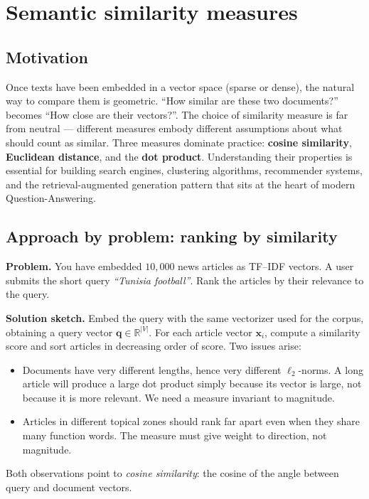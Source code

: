 \documentclass[12pt,a4paper]{report}
\theoremstyle{definition}
\theoremstyle{remark}
\begin{document}
\section{Semantic similarity measures}

\subsection{Motivation}
Once texts have been embedded in a vector space (sparse or dense), the natural way to compare them is geometric. ``How similar are these two documents?'' becomes ``How close are their vectors?''. The choice of similarity measure is far from neutral --- different measures embody different assumptions about what should count as similar. Three measures dominate practice: \textbf{cosine similarity}, \textbf{Euclidean distance}, and the \textbf{dot product}. Understanding their properties is essential for building search engines, clustering algorithms, recommender systems, and the retrieval-augmented generation pattern that sits at the heart of modern Question-Answering.

\subsection{Approach by problem: ranking by similarity}
\textbf{Problem.} You have embedded $10{,}000$ news articles as TF--IDF vectors. A user submits the short query \emph{``Tunisia football''}. Rank the articles by their relevance to the query.

\textbf{Solution sketch.} Embed the query with the same vectorizer used for the corpus, obtaining a query vector $\mathbf{q} \in \mathbb{R}^{|V|}$. For each article vector $\mathbf{x}_i$, compute a similarity score and sort articles in decreasing order of score. Two issues arise:
\begin{itemize}
    \item Documents have very different lengths, hence very different $\ell_2$-norms. A long article will produce a large dot product simply because its vector is large, not because it is more relevant. We need a measure invariant to magnitude.
    \item Articles in different topical zones should rank far apart even when they share many function words. The measure must give weight to direction, not magnitude.
\end{itemize}
Both observations point to \emph{cosine similarity}: the cosine of the angle between query and document vectors.
\end{document}
